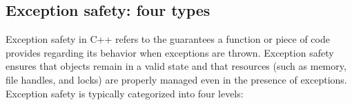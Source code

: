 \documentclass{report}
\begin{document}

\bigbreak \noindent 
\subsection{Exception safety: four types}
\bigbreak \noindent 
Exception safety in C++ refers to the guarantees a function or piece of code provides regarding its behavior when exceptions are thrown. Exception safety ensures that objects remain in a valid state and that resources (such as memory, file handles, and locks) are properly managed even in the presence of exceptions.
\bigbreak \noindent 
Exception safety is typically categorized into four levels:
\end{document}

